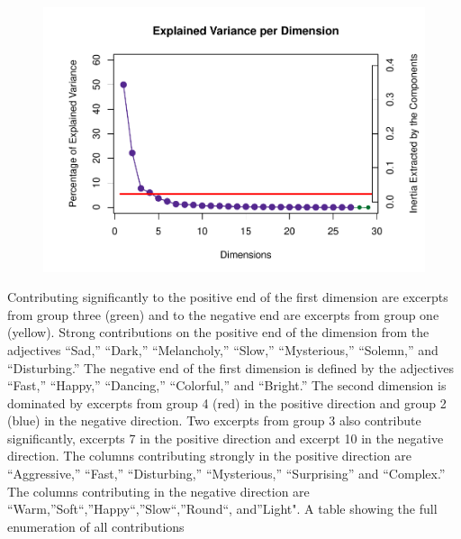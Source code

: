 \documentclass[
  english,
  man,floatsintext]{apa6}
\begin{document}
\begin{figure}

{\centering \includegraphics{Music-Descriptor-Space_files/figure-latex/scree4descriptors-1} 

}

\caption{ }\label{fig:scree4descriptors}
\end{figure}

Contributing significantly to the positive end of the first dimension are excerpts from group three (green) and to the negative end are excerpts from group one (yellow). Strong contributions on the positive end of the dimension from the adjectives ``Sad,'' ``Dark,'' ``Melancholy,'' ``Slow,'' ``Mysterious,'' ``Solemn,'' and ``Disturbing.'' The negative end of the first dimension is defined by the adjectives ``Fast,'' ``Happy,'' ``Dancing,'' ``Colorful,'' and ``Bright.''
The second dimension is dominated by excerpts from group 4 (red) in the positive direction and group 2 (blue) in the negative direction. Two excerpts from group 3 also contribute significantly, excerpts 7 in the positive direction and excerpt 10 in the negative direction. The columns contributing strongly in the positive direction are ``Aggressive,'' ``Fast,'' ``Disturbing,'' ``Mysterious,'' ``Surprising'' and ``Complex.'' The columns contributing in the negative direction are ``Warm,''Soft``,''Happy``,''Slow``,''Round``, and''Light". A table showing the full enumeration of all contributions
\end{document}
